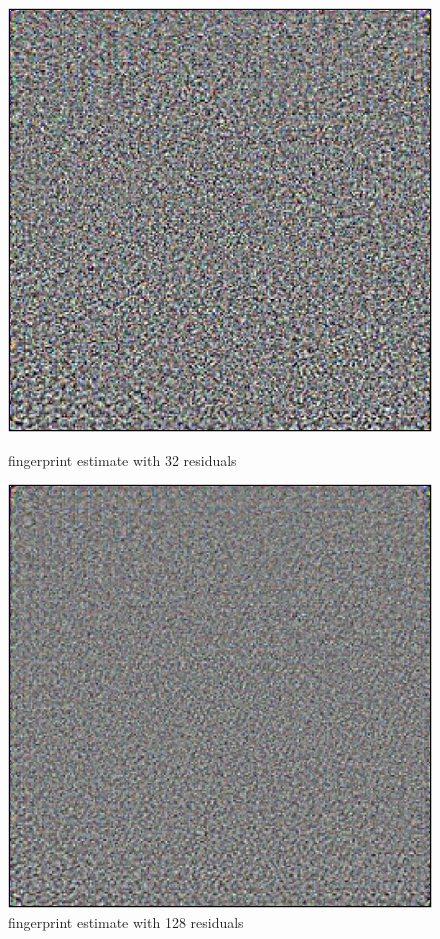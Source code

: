 \documentclass[fleqn,compress,utf8,aspectratio=169,t,handout]{beamer}
\begin{document}
\begin{frame}
	\begin{figure}[h]
    \centering
    \begin{minipage}{0.45\textwidth}
      \includegraphics[width = 0.8 \textwidth]{figs/ProGAN_Kitchen_F032.jpg}
      \caption{fingerprint estimate with 32 residuals}
    \end{minipage}
    \hfill
    \pause
		\begin{minipage}{0.45\textwidth}
      \includegraphics[width = 0.8 \textwidth]{figs/ProGAN_Kitchen_F128.jpg}
      \caption{fingerprint estimate with 128 residuals}
    \end{minipage}
	\end{figure}
\end{frame}
\end{document}
